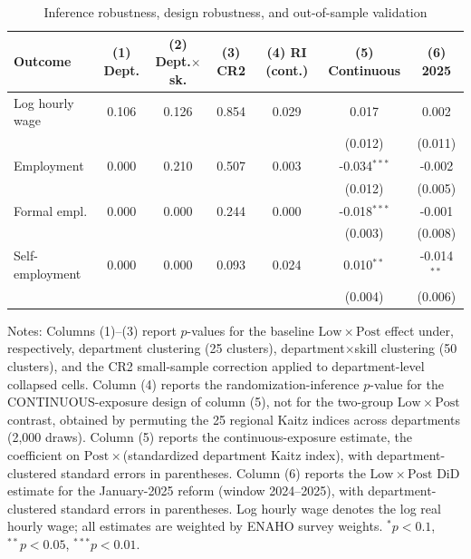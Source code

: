 \begin{table}[!tbp]\centering
\caption{Inference robustness, design robustness, and out-of-sample validation}\label{tab:inference}
\begin{threeparttable}
\footnotesize
\setlength{\tabcolsep}{3.5pt}
\begin{tabular}{lcccccc}
\toprule
Outcome & (1) Dept. & (2) Dept.$\times$sk. & (3) CR2 & (4) RI (cont.) & (5) Continuous & (6) 2025 \\
\midrule
Log hourly wage & 0.106 & 0.126 & 0.854 & 0.029 & 0.017 & 0.002 \\
 & & & & & (0.012) & (0.011) \\
Employment & 0.000 & 0.210 & 0.507 & 0.003 & -0.034$^{***}$ & -0.002 \\
 & & & & & (0.012) & (0.005) \\
Formal empl. & 0.000 & 0.000 & 0.244 & 0.000 & -0.018$^{***}$ & -0.001 \\
 & & & & & (0.003) & (0.008) \\
Self-employment & 0.000 & 0.000 & 0.093 & 0.024 & 0.010$^{**}$ & -0.014$^{**}$ \\
 & & & & & (0.004) & (0.006) \\
\bottomrule
\end{tabular}
\begin{tablenotes}\footnotesize
\item Notes: Columns (1)--(3) report $p$-values for the baseline $\mathrm{Low}\times\mathrm{Post}$ effect under, respectively, department clustering (25 clusters), department$\times$skill clustering (50 clusters), and the CR2 small-sample correction \citep{pustejovsky_tipton_2018} applied to department-level collapsed cells. Column (4) reports the randomization-inference $p$-value for the CONTINUOUS-exposure design of column (5), not for the two-group $\mathrm{Low}\times\mathrm{Post}$ contrast, obtained by permuting the 25 regional Kaitz indices across departments (2{,}000 draws). Column (5) reports the continuous-exposure estimate, the coefficient on $\mathrm{Post}\times$(standardized department Kaitz index), with department-clustered standard errors in parentheses. Column (6) reports the $\mathrm{Low}\times\mathrm{Post}$ DiD estimate for the January-2025 reform (window 2024--2025), with department-clustered standard errors in parentheses. Log hourly wage denotes the log real hourly wage; all estimates are weighted by ENAHO survey weights. $^{*}p<0.1$, $^{**}p<0.05$, $^{***}p<0.01$.
\end{tablenotes}
\end{threeparttable}\end{table}
